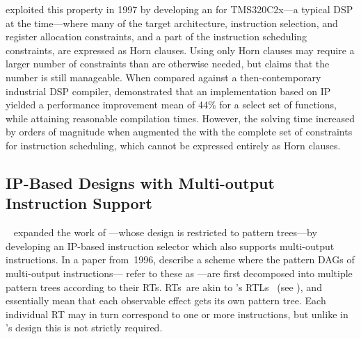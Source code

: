\textcite{Gebotys1997a} exploited this property in 1997 by developing an
\tIPmodel for \gls{TMS320C2x}---a typical \gls{DSP} at the time---where many
of the target architecture, \gls{instruction selection}, and \gls{register
  allocation} constraints, and a part of the \gls{instruction scheduling}
constraints, are expressed as \glspl{Horn clause}.
%
Using only \glspl{Horn
  clause} may require a larger number of constraints than are otherwise needed,
but \citeauthor{Gebotys1997a} claims that the number is still manageable.
%
When
compared against a then-contemporary industrial \gls{DSP} \gls{compiler},
\citeauthor{Gebotys1997a} demonstrated that an implementation based on \gls{IP}
yielded a performance improvement mean of 44\% for a select set of functions,
while attaining reasonable compilation times.
%
However, the solving time
increased by orders of magnitude when \citeauthor{Gebotys1997a} augmented the
\tIPmodel with the complete set of constraints for \gls{instruction scheduling},
which cannot be expressed entirely as \glspl{Horn clause}.


\subsection{IP-Based Designs with Multi-output Instruction Support}

\citeauthor{Leupers1996}~\cite{Leupers1995, Leupers1996} expanded the work of
\citeauthor{Wilson1994}\unskip%
%
---whose design is restricted to \glspl{pattern tree}---by developing an
\gls{IP}-based \gls{instruction selector} which also supports
\glspl{multi-output instruction}.
%
In a paper from~1996, \citeauthor{Leupers1996}
describe a scheme where the \glspl{pattern DAG} of \glspl{multi-output
  instruction}---\citeauthor{Leupers1996} refer to these as
\tcomplexPatterns\unskip%
%
---are first decomposed into multiple \glspl{pattern tree} according to their
\glspl{RT}.
%
\glspl{RT}~are akin to \citeauthor{Fraser1979}'s
\glspl{RTL}~\cite{Fraser1979} (see ), and
essentially mean that each observable effect gets its own \gls{pattern
  tree}.
%
Each individual \gls{RT} may in turn correspond to one or more
\glspl{instruction}, but unlike in \citeauthor{Fraser1979}'s design this is not
strictly required.

